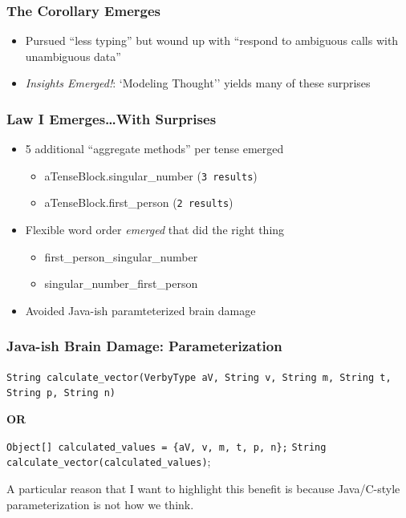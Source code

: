 \documentclass[slidestop,compress,mathserif]{beamer}
\begin{document}
\begin{frame}
	\frametitle{The Corollary Emerges}
	\begin{itemize}
		\item 	Pursued ``less typing'' but wound up with ``respond to ambiguous calls with unambiguous data''
		\pause
		\item  \emph{Insights Emerged!}:  `Modeling Thought'' yields many of these surprises
	\end{itemize}
\end{frame}


\begin{frame}
	\frametitle{Law I Emerges{\ldots}With Surprises}
	\begin{itemize}
		\item 5 additional ``aggregate methods'' per tense emerged
		\begin{itemize}
			\item {aTenseBlock}.singular\_number (\texttt{3 results})
			\item {aTenseBlock}.first\_person (\texttt{2 results})
		\end{itemize}

		\pause

		\item Flexible word order \emph{emerged} that did the right thing
		\begin{itemize}
			\item first\_person\_singular\_number
			\item singular\_number\_first\_person
		\end{itemize}

		\pause

		\item Avoided Java-ish paramteterized brain damage
	\end{itemize}
\end{frame}


\begin{frame}
	\frametitle{Java-ish Brain Damage:  Parameterization}
 	\texttt{String calculate\_vector(VerbyType aV, String v, String m, String t, String p, String n)}
	\vskip 0.5cm

	\begin{center}
		\textbf{OR}
	\end{center}

	\vskip 0.5cm
	\texttt{Object[] calculated\_values = \{aV, v, m, t, p, n\};}
	\texttt{String calculate\_vector(calculated\_values)};
\end{frame}
\note
{A particular reason that I want to highlight this benefit is because Java/C-style
parameterization is not how we think.
}
\end{document}
